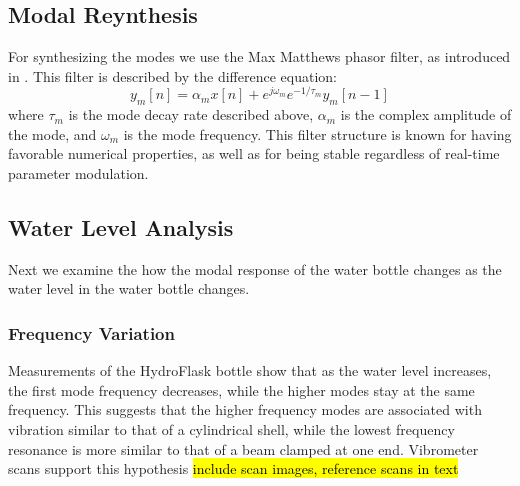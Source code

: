\documentclass[twoside,a4paper]{article}
\begin{document}
%
\subsection{Modal Reynthesis} \label{sec:synthesis}
%
For synthesizing the modes we use the Max Matthews
phasor filter, as introduced in \cite{phasorfilter}.
This filter is described by the difference equation:
\begin{equation}
    y_m[n] = \alpha_m x[n] + e^{j\omega_m} e^{-1/\tau_m} y_m[n-1]
    \label{eq:phasor}
\end{equation}
%
where $\tau_m$ is the mode decay rate described above,
$\alpha_m$ is the complex amplitude of the mode, and $\omega_m$
is the mode frequency. This filter structure is known for
having favorable numerical properties, as well as for being
stable regardless of real-time parameter modulation.
\subsection{Water Level Analysis} \label{sec:water}
%
Next we examine the how the modal response of the water bottle
changes as the water level in the water bottle changes. 
%
\subsubsection{Frequency Variation} \label{sec:water-freq}
%

Measurements of the HydroFlask bottle show that as the water
level increases, the first mode frequency decreases, while the
higher modes stay at the same frequency. This suggests that the higher frequency modes are associated with vibration similar to that of a cylindrical shell, while the lowest frequency resonance is more similar to that of a beam clamped at one end. Vibrometer scans support this hypothesis \hl{include scan images, reference scans in text}
\end{document}
